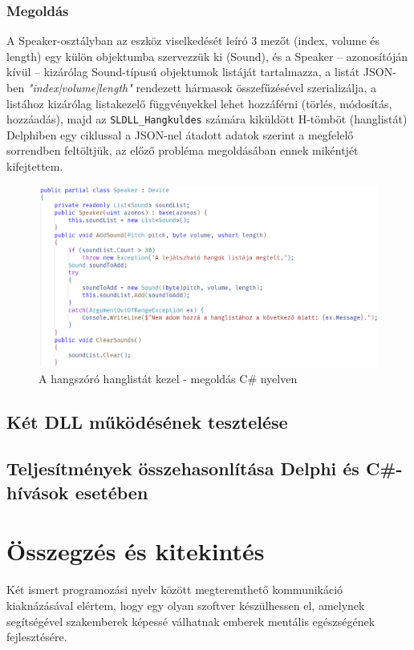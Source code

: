 \documentclass[tocnopagenum]{thesis-ekf}
\theoremstyle{definition}
\theoremstyle{remark}
\begin{document}
	\subsection{Megoldás}
	A Speaker-osztályban az eszköz viselkedését leíró 3 mezőt (index, volume és length) egy külön objektumba szervezzük ki (Sound), és a Speaker -- azonosítóján kívül -- kizárólag Sound-típusú objektumok listáját tartalmazza, a listát JSON-ben \textit{"index|volume|length"} rendezett hármasok összefűzésével szerializálja, a listához kizárólag listakezelő függvényekkel lehet hozzáférni (törlés, módosítás, hozzáadás), majd az \verb*|SLDLL_Hangkuldes| számára kiküldött H-tömböt (hanglistát) Delphiben egy ciklussal a JSON-nel átadott adatok szerint a megfelelő sorrendben feltöltjük, az előző probléma megoldásában ennek mikéntjét kifejtettem.
	\begin{figure}[h!]
		\centering
		\includegraphics[scale=0.7]{speaker_csharp}
		\caption{A hangszóró hanglistát kezel - megoldás C\# nyelven}
		\label{speaker_csharp}
	\end{figure}
	\section{Két DLL működésének tesztelése}
	\cite{sof_debug_dll}
	\section{Teljesítmények összehasonlítása Delphi és C\#-hívások esetében}
	\cite{sof_elapsed_time}
	
	\chapter*{Összegzés és kitekintés}
	Két ismert programozási nyelv között megteremthető kommunikáció kiaknázásával elértem, hogy egy olyan szoftver készülhessen el, amelynek segítségével szakemberek képessé válhatnak emberek mentális egészségének fejlesztésére. 
	
\end{document}
